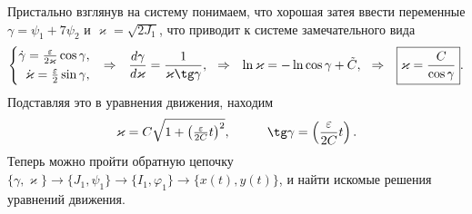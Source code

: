 Пристально взглянув на систему понимаем, что хорошая затея ввести переменные $\gamma = \psi_1 + 7 \psi_2$ и $\varkappa = \sqrt{2 J_1}$, что приводит к системе замечательного вида
\begin{equation*}
    \left\{\begin{aligned}
        \dot{\gamma} = \textstyle \frac{\varepsilon}{2 \varkappa} \cos \gamma, \\
        \dot{\kappa} = \textstyle \frac{\varepsilon}{2} \sin \gamma,
    \end{aligned}\right.
    \hspace{0.25cm} \Rightarrow \hspace{0.25cm}
    \frac{d \gamma}{d \varkappa} = \frac{1}{\varkappa \tg \gamma},
    \hspace{0.25cm} \Rightarrow \hspace{0.25cm}
    \ln \varkappa = - \ln \cos \gamma + \tilde{C},
    \hspace{0.25cm} \Rightarrow \hspace{0.25cm}
    \boxed{\varkappa = \frac{C}{\cos \gamma}}.
\end{equation*}
Подставляя это в уравнения движения, находим
\begin{equation*}
    \varkappa = C \sqrt{1 + \textstyle \left(\frac{\varepsilon}{2C}t\right)^2},
    \hspace{10 mm} 
    \tg \gamma = \left(\frac{\varepsilon}{2C}t\right).
\end{equation*}
Теперь можно пройти обратную цепочку $\{\gamma, \varkappa\} \to \{J_1, \psi_1\} \to \{I_1, \varphi_1\} \to \{x(t), y(t)\}$, и найти искомые решения уравнений движения.